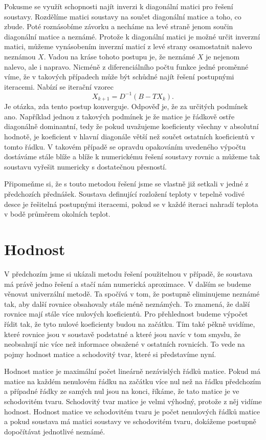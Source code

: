 \documentclass[12pt]{article}
\begin{document}
Pokusme se využít schopnosti najít inverzi k diagonální matici pro řešení soustavy. Rozdělíme matici soustavy na součet diagonální matice a toho, co zbude. Poté roznásobíme závorku a necháme na levé straně jenom součin diagonální matice a neznámé. Protože k diagonální matici je možné určit inverzní matici, můžeme vynásobením inverzní maticí z levé strany osamostatnit nalevo neznámou $X$. Vadou na kráse tohoto postupu je, že neznámé $X$ je nejenom nalevo, ale i napravo. Nicméně z diferenciálního počtu funkce jedné proměnné víme, že v takových případech může být schůdné najít řešení postupnými iteracemi. Nabízí se iterační vzorec $$X_{k+1}=D^{-1}(B-TX_k).$$ Je otázka, zda tento postup konverguje. Odpověď je, že za určitých podmínek ano. Například jednou z takových podmínek je že matice je řádkově ostře diagonálně dominantní, tedy že pokud uvažujeme koeficienty všechny v absolutní hodnotě, je koeficient v hlavní diagonále větší než součet ostatních koeficientů v tomto řádku. V takovém případě se opravdu opakováním uvedeného výpočtu dostáváme stále blíže a blíže k numerickému řešení soustavy rovnic a můžeme tak soustavu vyřešit numericky s dostatečnou přesností. 

Připomeňme si, že s touto metodou řešení jsme se vlastně již setkali v jedné z předchozích přednášek. Soustava definující rozložení teploty v tepelně vodivé desce je řešitelná postupnými iteracemi, pokud se v každé iteraci nahradí teplota v bodě průměrem okolních teplot.

\section{Hodnost}

V předchozím jsme si ukázali metodu řešení použitelnou v případě, že soustava má právě jedno řešení a stačí nám numerická aproximace. V dalším se budeme věnovat univerzální metodě. Ta spočívá v tom, že postupně eliminujeme neznámé tak, aby další rovnice obsahovaly stále méně neznámých. To znamená, že další rovnice mají stále více nulových koeficientů. Pro přehlednost budeme výpočet řídit tak, že tyto nulové koeficienty budou na začátku. Tím také pěkně uvidíme, které rovnice jsou v soustavě podstatné a které jsou navíc v tom smyslu, že neobsahují nic více než informace obsažené v ostatních rovnicích. To vede na pojmy hodnost matice a schodovitý tvar, které si představíme nyní. 

Hodnost matice je maximální počet lineárně nezávislých řádků matice. Pokud má matice na každém nenulovém řádku na začátku více nul než na řádku předchozím a případné řádky ze samých nul jsou na konci, říkáme, že tato matice je ve schodovitém tvaru. Schodovitý tvar matice je velmi výhodný, protože z něj vidíme hodnost. Hodnost matice ve schodovitém tvaru je počet nenulových řádků matice a pokud soustava má matici soustavy ve schodovitém tvaru, dokážeme postupně dopočítávat jednotlivé neznámé. 
\end{document}
